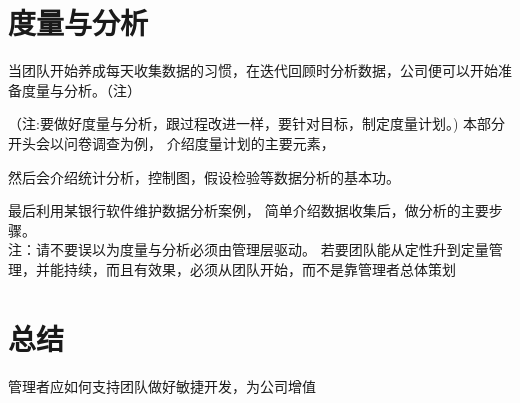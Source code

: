 \documentclass{book}        %
\begin{document}



\part{度量与分析}当团队开始养成每天收集数据的习惯，在迭代回顾时分析数据，公司便可以开始准备度量与分析。（注）


（注:要做好度量与分析，跟过程改进一样，要针对目标，制定度量计划。)
本部分开头会以问卷调查为例，
介绍度量计划的主要元素，

然后会介绍统计分析，控制图，假设检验等数据分析的基本功。

最后利用某银行软件维护数据分析案例，
简单介绍数据收集后，做分析的主要步骤。\\


注：请不要误以为度量与分析必须由管理层驱动。
若要团队能从定性升到定量管理，并能持续，而且有效果，必须从团队开始，而不是靠管理者总体策划
\\

\appendix


\part{总结} 管理者应如何支持团队做好敏捷开发，为公司增值\\


\end{document}
